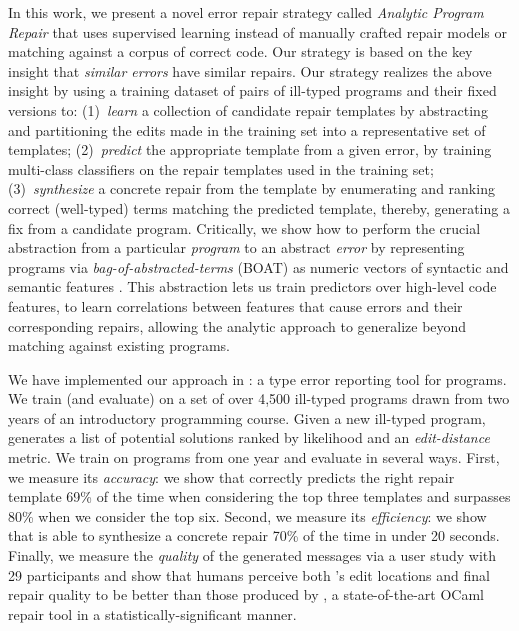 %
In this work, we present a novel error repair
strategy called \emph{Analytic Program Repair}
that uses supervised learning instead of manually
crafted repair models or matching against a corpus
of correct code.
%
Our strategy is based on the key insight that
\emph{similar errors} have similar repairs.
%
Our strategy realizes the above insight by using
a training dataset of pairs of ill-typed programs
and their fixed versions to:
%
(1)~\emph{learn} a collection of candidate repair templates
    by abstracting and partitioning the edits made in the
    training set into a representative set of templates;
%
(2)~\emph{predict} the appropriate template from a given error,
    by training multi-class classifiers on the repair templates
    used in the training set;
%
(3)~\emph{synthesize} a concrete repair from the template
   by enumerating and ranking correct (\eg well-typed)
   terms matching the predicted template,
%
thereby, generating a fix from a candidate program.
%
Critically, we show how to perform the crucial abstraction
from a particular \emph{program} to an abstract \emph{error}
by representing programs via \emph{bag-of-abstracted-terms} (BOAT)
\ie as numeric vectors of syntactic and semantic features \citep{Seidel2017-ko}.
%
This abstraction lets us train predictors over high-level
code features, \ie to learn correlations between features
that cause errors and their corresponding repairs, allowing
the analytic approach to generalize beyond matching against
existing programs.

\mypara{\toolname}
%
We have implemented our approach in \toolname: a type error reporting
tool for \ocaml programs. We train (and evaluate) \toolname on a set of
over 4,500 ill-typed \ocaml programs drawn from two years of an
introductory programming course.
%
Given a new ill-typed program, \toolname generates a list of potential
solutions ranked by likelihood and an \emph{edit-distance} metric.
We train \toolname on programs from one year and evaluate in several
ways.
%
First, we measure its \emph{accuracy}: we show that \toolname correctly predicts
the right repair template 69\% of the time when considering the top three
templates and surpasses 80\% when we consider the top six.
%
Second, we measure its \emph{efficiency}: we show that \toolname is able to
synthesize a concrete repair 70\% of the time in under 20 seconds.
%
Finally, we measure the \emph{quality} of the generated messages via a user
study with 29 participants and show that humans perceive both \toolname's edit
locations and final repair quality to be better than those produced by \seminal,
a state-of-the-art OCaml repair tool \citep{Lerner2007-dt} in a
statistically-significant manner.


